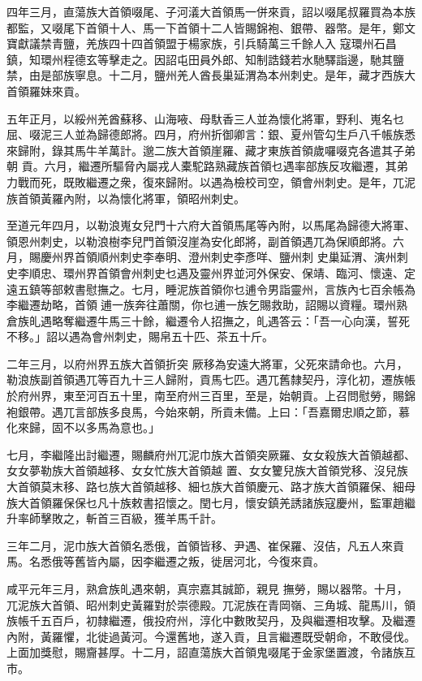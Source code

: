 \begin{pinyinscope}
 四年三月，直蕩族大首領啜尾、子河𣿭大首領馬一併來貢，詔以啜尾叔羅買為本族都監，又啜尾下首領十人、馬一下首領十二人皆賜錦袍、銀帶、器幣。是年，鄭文寶獻議禁青鹽，羌族四十四首領盟于楊家族，引兵騎萬三千餘人入
 寇環州石昌鎮，知環州程德玄等擊走之。因詔屯田員外郎、知制誥錢若水馳驛詣邊，馳其鹽禁，由是部族寧息。十二月，鹽州羌人酋長巢延渭為本州刺史。是年，藏才西族大首領羅妹來貢。



 五年正月，以綏州羌酋蘇移、山海㖡、母馱香三人並為懷化將軍，野利、嵬名乜屈、啜泥三人並為歸德郎將。四月，府州折御卿言：銀、夏州管勾生戶八千帳族悉來歸附，錄其馬牛羊萬計。邈二族大首領崖羅、藏才東族首領歲囉啜克各遣其子弟朝
 貢。六月，繼遷所驅脅內屬戎人橐駝路熟藏族首領乜遇率部族反攻繼遷，其弟力戰而死，既敗繼遷之衆，復來歸附。以遇為檢校司空，領會州刺史。是年，兀泥族首領黃羅內附，以為懷化將軍，領昭州刺史。



 至道元年四月，以勒浪嵬女兒門十六府大首領馬尾等內附，以馬尾為歸德大將軍、領恩州刺史，以勒浪樹李兒門首領沒崖為安化郎將，副首領遇兀為保順郎將。六月，賜慶州界首領順州刺史李奉明、澄州刺史李彥咩、鹽州刺
 史巢延渭、演州刺史李順忠、環州界首領會州刺史乜遇及靈州界並河外保安、保靖、臨河、懷遠、定遠五鎮等部敕書慰撫之。七月，睡泥族首領你乜逋令男詣靈州，言族內七百余帳為李繼遷劫略，首領𠵚逋一族奔往蕭關，你乜逋一族乞賜救助，詔賜以資糧。環州熟倉族癿遇略奪繼遷牛馬三十餘，繼遷令人招撫之，癿遇答云：「吾一心向漢，誓死不移。」詔以遇為會州刺史，賜帛五十匹、茶五十斤。



 二年三月，以府州界五族大首領折突
 厥移為安遠大將軍，父死來請命也。六月，勒浪族副首領遇兀等百九十三人歸附，貢馬七匹。遇兀舊隸契丹，淳化初，遷族帳於府州界，東至河百五十里，南至府州三百里，至是，始朝貢。上召問慰勞，賜錦袍銀帶。遇兀言部族多良馬，今始來朝，所貢未備。上曰：「吾嘉爾忠順之節，慕化來歸，固不以多馬為意也。」



 七月，李繼隆出討繼遷，賜麟府州兀泥巾族大首領突厥羅、女女殺族大首領越都、女女夢勒族大首領越移、女女忙族大首領越
 置、女女籰兒族大首領党移、沒兒族大首領莫末移、路乜族大首領越移、細乜族大首領慶元、路才族大首領羅保、細母族大首領羅保保乜凡十族敕書招懷之。閏七月，懷安鎮羌誘諸族寇慶州，監軍趙繼升率師擊敗之，斬首三百級，獲羊馬千計。



 三年二月，泥巾族大首領名悉俄，首領皆移、尹遇、崔保羅、沒佶，凡五人來貢馬。名悉俄等舊皆內屬，因李繼遷之叛，徙居河北，今復來貢。



 咸平元年三月，熟倉族癿遇來朝，真宗嘉其誠節，親見
 撫勞，賜以器幣。十月，兀泥族大首領、昭州刺史黃羅對於崇德殿。兀泥族在青岡嶺、三角城、龍馬川，領族帳千五百戶，初隸繼遷，俄投府州，淳化中數敗契丹，及與繼遷相攻擊。及繼遷內附，黃羅懼，北徙過黃河。今還舊地，遂入貢，且言繼遷既受朝命，不敢侵伐。上面加獎慰，賜齎甚厚。十二月，詔直蕩族大首領鬼啜尾于金家堡置渡，令諸族互市。




\end{pinyinscope}
